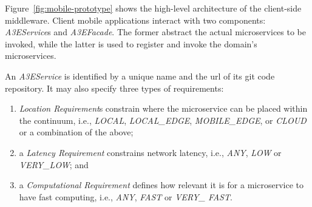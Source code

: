 Figure~\ref{fig:mobile-prototype} shows the high-level architecture of the client-side middleware. Client mobile applications interact with two components: \textit{A3EService}s and \textit{A3EFacade}. The former abstract the actual microservices to be invoked, while the latter is used to register and invoke the domain's microservices. 

An \textit{A3EService} is identified by a unique name and the url of its git code repository. It may also specify three types of requirements: 

\begin{enumerate}


	\item \textit{Location Requirement}s constrain where the microservice can be placed within the continuum, i.e., \textit{LOCAL}, \textit{LOCAL\_EDGE}, \textit{MOBILE\_EDGE}, or \textit{CLOUD} or a combination of the above; 


	\item a \textit{Latency Requirement} constrains network latency, i.e., \textit{ANY}, \textit{LOW} or \textit{VERY\_LOW}; and 
	

	\item a \textit{Computational Requirement} defines how relevant it is for a microservice to have fast computing, i.e., \textit{ANY}, \textit{FAST} or \textit{VERY\_ FAST}. 


\end{enumerate}


